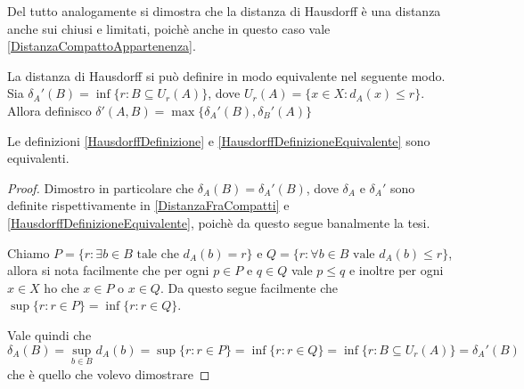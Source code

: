 \begin{remark}
	Del tutto analogamente si dimostra che la distanza di Hausdorff è una distanza anche sui chiusi e limitati, poichè anche in questo caso vale \cref{DistanzaCompattoAppartenenza}.
\end{remark}

\begin{definition} \label{HausdorffDefinizioneEquivalente}
	La distanza di Hausdorff si può definire in modo equivalente nel seguente modo. Sia $\delta_A'(B)=\inf\{r:B\subseteq U_r(A)\}$, dove $U_r(A)=\{x\in X : d_A(x)\le r \}$. Allora definisco $\delta'(A,B)=\max\{\delta_A'(B),\delta_B'(A)\}$
\end{definition}

\begin{theorem}
	Le definizioni \cref{HausdorffDefinizione} e \cref{HausdorffDefinizioneEquivalente} sono equivalenti.
\end{theorem}
\begin{proof}
	Dimostro in particolare che $\delta_A(B)=\delta_A'(B)$, dove $\delta_A$ e $\delta_A'$ sono definite rispettivamente in \cref{DistanzaFraCompatti} e \cref{HausdorffDefinizioneEquivalente}, poichè da questo segue banalmente la tesi.
	
	Chiamo $P=\{ r : \exists b\in B \text{ tale che }d_A(b)=r \}$ e $Q=\{ r: \forall b\in B\text{ vale } d_A(b)\le r \}$, allora si nota facilmente che per ogni $p\in P$ e $q\in Q$ vale $p\le q$ e inoltre per ogni $x\in X$ ho che $x\in P$ o $x\in Q$. Da questo segue facilmente che $\sup\{ r: r\in P \}=\inf\{r: r\in Q \}$.
	
	Vale quindi che
	\begin{equation*}
		\delta_A(B)=\sup_{b\in B} d_A(b)=\sup\{ r : r\in P \}=\inf\{ r : r\in Q \}= \inf\{ r : B\subseteq U_r(A) \}=\delta_A'(B)
	\end{equation*}
	che è quello che volevo dimostrare
\end{proof}

